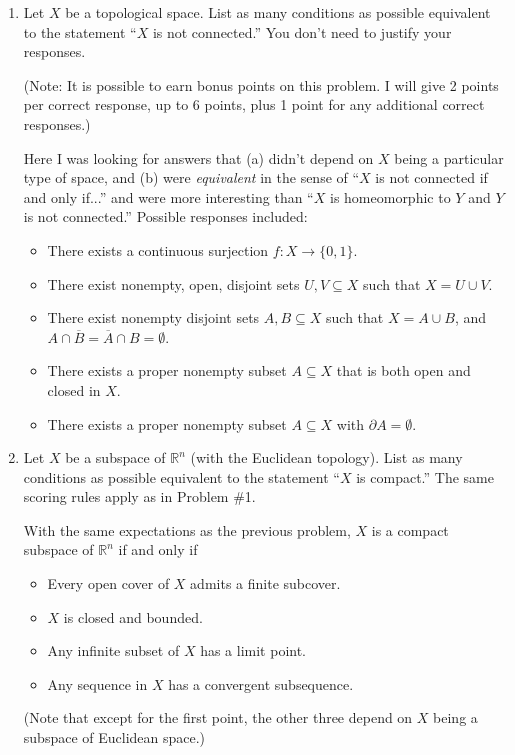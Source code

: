 \documentclass[12pt]{article}
\newcommand{\points}[1]{\marginpar{\hspace{24pt}[#1]}}
\newcommand{\R}{\mathbb{R}}
\begin{document}
\begin{enumerate}
\item Let $X$ be a topological space. List as many conditions as possible equivalent to the statement ``$X$ is not connected.'' \points{6} You don't need to justify your responses.

(Note: It is possible to earn bonus points on this problem. I will give 2 points per correct response, up to 6 points, plus 1 point for any additional correct responses.)

\bigskip

Here I was looking for answers that (a) didn't depend on $X$ being a particular type of space, and (b) were {\em equivalent} in the sense of ``$X$ is not connected if and only if...'' and were more interesting than ``$X$ is homeomorphic to $Y$ and $Y$ is not connected.'' Possible responses included:
\begin{itemize}
 \item There exists a continuous surjection $f:X\to \{0,1\}$.
 \item There exist nonempty, open, disjoint sets $U,V\subseteq X$ such that $X=U\cup V$.
 \item There exist nonempty disjoint sets $A,B\subseteq X$ such that $X=A\cup B$, and $A\cap \overline{B} = \overline{A}\cap B = \emptyset$.
 \item There exists a proper nonempty subset $A\subseteq X$ that is both open and closed in $X$.
 \item There exists a proper nonempty subset $A\subseteq X$ with $\partial A = \emptyset$.
\end{itemize}

\bigskip

\item Let $X$ be a subspace of $\R^n$ (with the Euclidean topology). List as many conditions as possible equivalent to the statement ``$X$ is compact.'' \points{6} The same scoring rules apply as in Problem \#1.


\bigskip

With the same expectations as the previous problem, $X$ is a compact subspace of $\R^n$ if and only if
\begin{itemize}
 \item Every open cover of $X$ admits a finite subcover.
 \item $X$ is closed and bounded.
 \item Any infinite subset of $X$ has a limit point.
 \item Any sequence in $X$ has a convergent subsequence.
\end{itemize}
(Note that except for the first point, the other three depend on $X$ being a subspace of Euclidean space.)


\end{enumerate}
\end{document}
